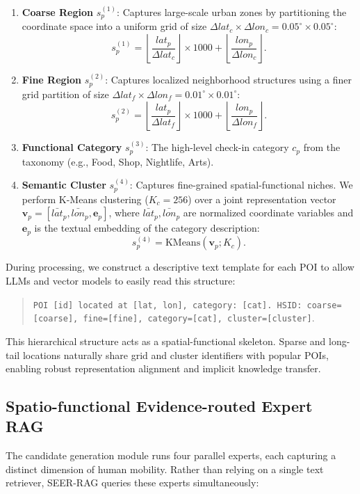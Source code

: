 \documentclass[10pt,twocolumn]{article}
\newcommand{\code}[1]{\texttt{#1}}
\begin{document}
\begin{enumerate}
    \item \textbf{Coarse Region} $s^{(1)}_p$: Captures large-scale urban zones by partitioning the coordinate space into a uniform grid of size $\Delta lat_c \times \Delta lon_c = 0.05^\circ \times 0.05^\circ$:
    \begin{equation}
        s^{(1)}_p = \left\lfloor \frac{lat_p}{\Delta lat_c} \right\rfloor \times 1000 + \left\lfloor \frac{lon_p}{\Delta lon_c} \right\rfloor.
    \end{equation}
    \item \textbf{Fine Region} $s^{(2)}_p$: Captures localized neighborhood structures using a finer grid partition of size $\Delta lat_f \times \Delta lon_f = 0.01^\circ \times 0.01^\circ$:
    \begin{equation}
        s^{(2)}_p = \left\lfloor \frac{lat_p}{\Delta lat_f} \right\rfloor \times 1000 + \left\lfloor \frac{lon_p}{\Delta lon_f} \right\rfloor.
    \end{equation}
    \item \textbf{Functional Category} $s^{(3)}_p$: The high-level check-in category $c_p$ from the taxonomy (e.g., Food, Shop, Nightlife, Arts).
    \item \textbf{Semantic Cluster} $s^{(4)}_p$: Captures fine-grained spatial-functional niches. We perform K-Means clustering ($K_c = 256$) over a joint representation vector $\mathbf{v}_p = [\bar{lat}_p, \bar{lon}_p, \mathbf{e}_p]$, where $\bar{lat}_p, \bar{lon}_p$ are normalized coordinate variables and $\mathbf{e}_p$ is the textual embedding of the category description:
    \begin{equation}
        s^{(4)}_p = \mathrm{KMeans}(\mathbf{v}_p; K_c).
    \end{equation}
\end{enumerate}

During processing, we construct a descriptive text template for each POI to allow LLMs and vector models to easily read this structure:
\begin{quote}
\code{POI [id] located at [lat, lon], category: [cat]. HSID: coarse=[coarse], fine=[fine], category=[cat], cluster=[cluster]}.
\end{quote}
This hierarchical structure acts as a spatial-functional skeleton. Sparse and long-tail locations naturally share grid and cluster identifiers with popular POIs, enabling robust representation alignment and implicit knowledge transfer.

\subsection{Spatio-functional Evidence-routed Expert RAG}
The candidate generation module runs four parallel experts, each capturing a distinct dimension of human mobility. Rather than relying on a single text retriever, SEER-RAG queries these experts simultaneously:
\end{document}

